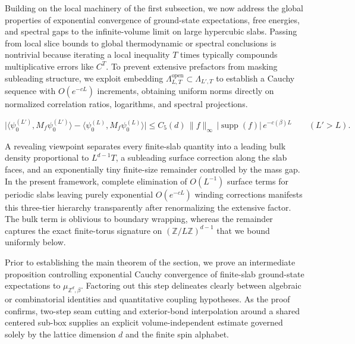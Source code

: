 \documentclass[11pt]{article}
\theoremstyle{definition}
\begin{document}
Building on the local machinery of the first subsection, we now address the global
properties of exponential convergence of ground-state expectations, free energies,
and spectral gaps to the infinite-volume limit on large hypercubic slabs. Passing
from local slice bounds to global thermodynamic or spectral conclusions is
nontrivial because iterating a local inequality $T$ times typically compounds
multiplicative errors like $C^T$. To prevent extensive prefactors from masking
subleading structure, we exploit embedding $\Lambda_{L,T}^{\mathrm{open}} \subset
\Lambda_{L',T}$ to establish a Cauchy sequence with $O(e^{-c L})$ increments,
obtaining uniform norms directly on normalized correlation ratios, logarithms, and
spectral projections.

\[
  \bigl|\langle \psi_0^{(L')}, M_f \psi_0^{(L')} \rangle - \langle \psi_0^{(L)}, M_f \psi_0^{(L)} \rangle\bigr| \le C_5(d) \, \|f\|_\infty \, |\operatorname{supp}(f)| \, e^{-c(\beta) L} \qquad (L' > L).
\]

A revealing viewpoint separates every finite-slab quantity into a leading bulk
density proportional to $L^{d-1} T$, a subleading surface correction along the slab
faces, and an exponentially tiny finite-size remainder controlled by the mass gap.
In the present framework, complete elimination of $O(L^{-1})$ surface terms for
periodic slabs leaving purely exponential $O(e^{-c L})$ winding corrections
manifests this three-tier hierarchy transparently after renormalizing the extensive
factor. The bulk term is oblivious to boundary wrapping, whereas the remainder
captures the exact finite-torus signature on $(\mathbb{Z}/L\mathbb{Z})^{d-1}$ that
we bound uniformly below.

Prior to establishing the main theorem of the section, we prove an intermediate
proposition controlling exponential Cauchy convergence of finite-slab ground-state
expectations to $\mu_{\mathbb{Z}^d, \beta}$. Factoring out this step delineates
clearly between algebraic or combinatorial identities and quantitative coupling
hypotheses. As the proof confirms, two-step seam cutting and exterior-bond
interpolation around a shared centered sub-box supplies an explicit
volume-independent estimate governed solely by the lattice dimension $d$ and the
finite spin alphabet.
\end{document}
